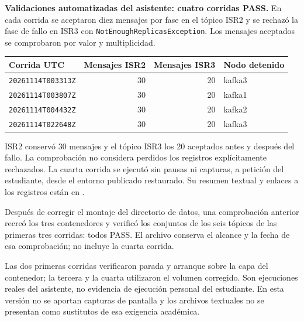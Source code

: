 \textbf{Validaciones automatizadas del asistente: cuatro corridas PASS.} En cada corrida se aceptaron diez mensajes por fase en el tópico ISR2 y se rechazó la fase de fallo en ISR3 con \texttt{NotEnoughReplicasException}. Los mensajes aceptados se comprobaron por valor y multiplicidad.
\begin{center}
\begin{tabular}{lrrl}\toprule
Corrida UTC & Mensajes ISR2 & Mensajes ISR3 & Nodo detenido\\\midrule
\texttt{20261114T003313Z} & 30 & 20 & kafka3 \\
\texttt{20261114T003807Z} & 30 & 20 & kafka1 \\
\texttt{20261114T004432Z} & 30 & 20 & kafka2 \\
\texttt{20261114T022648Z} & 30 & 20 & kafka3 \\
\bottomrule\end{tabular}
\end{center}
ISR2 conservó 30 mensajes y el tópico ISR3 los 20 aceptados antes y después del fallo. La comprobación no considera perdidos los registros explícitamente rechazados. La cuarta corrida se ejecutó sin pausas ni capturas, a petición del estudiante, desde el entorno publicado restaurado. Su resumen textual y enlaces a los registros están en .

Después de corregir el montaje del directorio de datos, una comprobación anterior recreó los tres contenedores y verificó los conjuntos de los seis tópicos de las primeras tres corridas: todos PASS. El archivo  conserva el alcance y la fecha de esa comprobación; no incluye la cuarta corrida.

Las dos primeras corridas verificaron parada y arranque sobre la capa del contenedor; la tercera y la cuarta utilizaron el volumen corregido. Son ejecuciones reales del asistente, no evidencia de ejecución personal del estudiante. En esta versión no se aportan capturas de pantalla y los archivos textuales no se presentan como sustitutos de esa exigencia académica.
